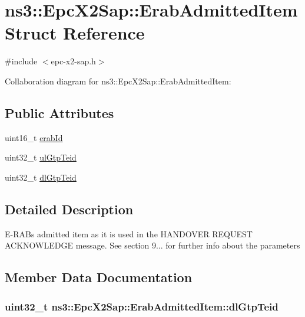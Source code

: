 \hypertarget{structns3_1_1EpcX2Sap_1_1ErabAdmittedItem}{}\section{ns3\+:\+:Epc\+X2\+Sap\+:\+:Erab\+Admitted\+Item Struct Reference}
\label{structns3_1_1EpcX2Sap_1_1ErabAdmittedItem}


{\ttfamily \#include $<$epc-\/x2-\/sap.\+h$>$}



Collaboration diagram for ns3\+:\+:Epc\+X2\+Sap\+:\+:Erab\+Admitted\+Item\+:
\subsection*{Public Attributes}
\begin{DoxyCompactItemize}
\item 
uint16\+\_\+t \hyperlink{structns3_1_1EpcX2Sap_1_1ErabAdmittedItem_aa97b379c6f1125823af419f91b0593f4}{erab\+Id}
\item 
uint32\+\_\+t \hyperlink{structns3_1_1EpcX2Sap_1_1ErabAdmittedItem_a687ed49224a6fcd23acd35b970495d0e}{ul\+Gtp\+Teid}
\item 
uint32\+\_\+t \hyperlink{structns3_1_1EpcX2Sap_1_1ErabAdmittedItem_a55e7e19f425b80f79d4068f3c3bdcbf3}{dl\+Gtp\+Teid}
\end{DoxyCompactItemize}


\subsection{Detailed Description}
E-\/\+R\+A\+Bs admitted item as it is used in the H\+A\+N\+D\+O\+V\+ER R\+E\+Q\+U\+E\+ST A\+C\+K\+N\+O\+W\+L\+E\+D\+GE message. See section 9... for further info about the parameters 

\subsection{Member Data Documentation}
\subsubsection[{\texorpdfstring{dl\+Gtp\+Teid}{dlGtpTeid}}]{\setlength{\rightskip}{0pt plus 5cm}uint32\+\_\+t ns3\+::\+Epc\+X2\+Sap\+::\+Erab\+Admitted\+Item\+::dl\+Gtp\+Teid}\hypertarget{structns3_1_1EpcX2Sap_1_1ErabAdmittedItem_a55e7e19f425b80f79d4068f3c3bdcbf3}{}\label{structns3_1_1EpcX2Sap_1_1ErabAdmittedItem_a55e7e19f425b80f79d4068f3c3bdcbf3}
